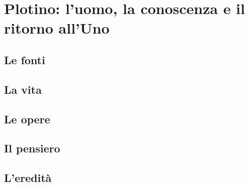 \chapter{Plotino: l'uomo, la conoscenza e il ritorno all'Uno}

\section{Le fonti}

\section{La vita}

\section{Le opere}

\section{Il pensiero}

\section{L'eredità}
